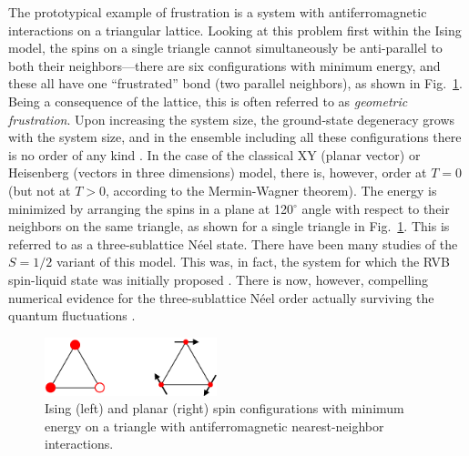 \documentclass[draft,numberedheadings]{aipproc}
\begin{document}
The prototypical example of frustration is a system with antiferromagnetic interactions on a triangular lattice. Looking at this 
problem first within the Ising model, the spins on a single triangle cannot simultaneously be anti-parallel to both their neighbors---there are six configurations 
with minimum energy, and these all have one ``frustrated'' bond (two parallel neighbors), as shown in Fig.~\ref{triangles}. Being a consequence of the lattice, 
this is often referred to as {\it geometric frustration}. Upon increasing the system size, the ground-state degeneracy grows with the system size, and in the ensemble 
including all these configurations there is no order of any kind \cite{stephenson,blote}. In the case of the classical XY (planar vector) or Heisenberg (vectors in 
three dimensions) model, there is, however, order at $T=0$ (but not at $T>0$, according to the Mermin-Wagner theorem). The energy is minimized by arranging the spins 
in a plane at 120$^\circ$ angle with respect to their neighbors on the same triangle, as shown for a single triangle in Fig.~\ref{triangles}. This is referred 
to as a three-sublattice N\'eel state. There have been many studies of the $S=1/2$ variant of this model. This was, in fact, the system for which the RVB spin-liquid 
state was initially proposed \cite{fezekas}. There is now, however, compelling numerical evidence for the three-sublattice N\'eel order actually surviving the 
quantum fluctuations \cite{bernu,chernyshev}.

\begin{figure}
\includegraphics[width=5cm, clip]{triangles.eps}
\caption{Ising (left) and planar (right) spin configurations with minimum energy on a triangle with antiferromagnetic nearest-neighbor interactions.}
\label{triangles}
\end{figure}
\end{document}
